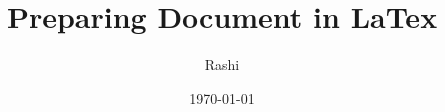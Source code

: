 \documentclass{article}
\begin{document}
	\title{Preparing Document in LaTex}
	\author{Rashi}
	\date{\today}
	\maketitle
	\textbf{\textit{\blindtext}}\\
	\begin{multicols}{2}
		\lipsum
	\end{multicols}
\end{document}
